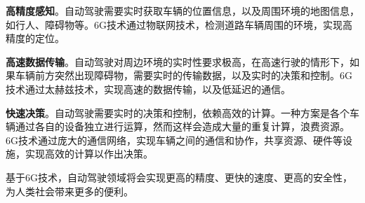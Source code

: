 \documentclass{article}
\begin{document}
\textbf{高精度感知}。自动驾驶需要实时获取车辆的位置信息，以及周围环境的地图信息，如行人、障碍物等。6G技术通过物联网技术，检测道路车辆周围的环境，实现高精度的定位。

\textbf{高速数据传输}。自动驾驶对周边环境的实时性要求极高，在高速行驶的情形下，如果车辆前方突然出现障碍物，需要实时的传输数据，以及实时的决策和控制。6G技术通过太赫兹技术，实现高速的数据传输，以及低延迟的通信。

\textbf{快速决策}。自动驾驶需要实时的决策和控制，依赖高效的计算。一种方案是各个车辆通过各自的设备独立进行运算，然而这样会造成大量的重复计算，浪费资源。6G技术通过庞大的通信网络，实现车辆之间的通信和协作，共享资源、硬件等设施，实现高效的计算以作出决策。

基于6G技术，自动驾驶领域将会实现更高的精度、更快的速度、更高的安全性，为人类社会带来更多的便利。



\end{document}
